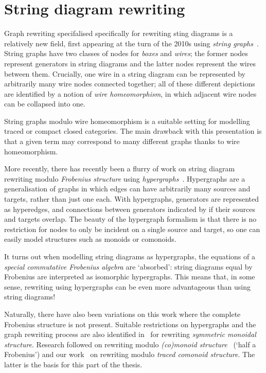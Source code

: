 \section{String diagram rewriting}

Graph rewriting specifalised specifically for rewriting sting diagrams is a
relatively new field, first appearing at the turn of the 2010s using
\emph{string graphs}~\cite{%
    dixon2010open,dixon2013opengraphs,kissinger2012pictures%
}.
String graphs have two classes of nodes for \emph{boxes} and \emph{wires}; the
former nodes represent generators in string diagrams and the latter nodes
represent the wires between them.
Crucially, one wire in a string diagram can be represented by arbitrarily
many wire nodes connected together; all of these different depictions are
identified by a notion of \emph{wire homeomorphism}, in which adjacent wire
nodes can be collapsed into one.

\begin{center}
\end{center}

String graphs modulo wire homeomorphism is a suitable setting for modelling
traced or compact closed categories.
The main drawback with this presentation is that a given term may correspond to
many different graphs thanks to wire homeomorphism.

More recently, there has recently been a flurry of work on string
diagram rewriting modulo \emph{Frobenius structure} using
\emph{hypergraphs}~\cite{%
    bonchi2016rewriting,zanasi2017rewriting,bonchi2017confluence,%
    bonchi2018rewriting,bonchi2022string,bonchi2022stringa,bonchi2022stringb%
}.
Hypergraphs are a generalisation of graphs in which edges can have arbitrarily
many sources and targets, rather than just one each.
With hypergraphs, generators are represented as hyperedges, and connections
between generators indicated by if their sources and targets overlap.
The beauty of the hypergraph formalism is that there is no restriction for
nodes to only be incident on a single source and target, so one can easily
model structures such as monoids or comonoids.

\begin{center}
\end{center}

It turns out when modelling string diagrams as hypergraphs, the equations of
a \emph{special commutative Frobenius algebra} are `absorbed': string diagrams
equal by Frobenius are interpreted as isomorphic hypergraphs.
This means that, in some sense, rewriting using hypergraphs can be even more
advantageous than using string diagrams!

Naturally, there have also been variations on this work where the complete
Frobenius structure is not present.
Suitable restrictions on hypergraphs and the graph rewriting process are also
identified in~\cite{bonchi2016rewriting} for rewriting
\emph{symmetric monoidal structure}.
Research followed on rewriting modulo
\emph{(co)monoid structure}~\cite{milosavljevic2023string} (`half a Frobenius')
and our work~\cite{ghica2023rewriting} on rewriting modulo
\emph{traced comonoid structure}.
The latter is the basis for this part of the thesis.